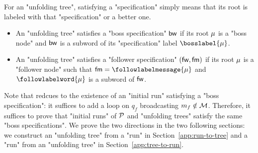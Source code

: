 For an "unfolding tree", satisfying a "specification" simply means that its root is labeled with that "specification" or a better one.

\begin{itemize}
	\item An "unfolding tree" satisfies a "boss specification" $\mathsf{bw}$ if its root $\mu$ is a "boss node" and $\mathsf{bw}$ is a subword of its "specification" label $\bosslabel{\node}$.
	
	\item An "unfolding tree" satisfies a "follower specification" $(\mathsf{fw}, \mathsf{fm})$ if its root $\mu$ is a "follower node" such that $\followmessagespec=\followlabelmessage{\node}$ and  $\followlabelword{\node}$ is a subword of $\mathsf{fw}$.
\end{itemize}

Note that \COVER redcues to the existence of an "initial run" satisfying a "boss specification": it suffices to add a loop on $q_f$ broadcasting $m_f \notin \mathcal{M}$. Therefore, it suffices to prove that "initial runs" of $\mathcal{P}$ and "unfolding trees" satisfy the same "boss specifications". We prove the two directions in the two following sections: we construct an "unfolding tree" from a "run" in  Section~\ref{app:run-to-tree} and a "run" from an "unfolding tree" in Section~\ref{app:tree-to-run}.





	

